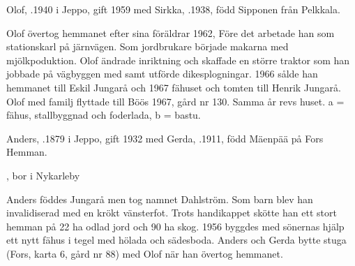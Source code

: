 %



%
Olof, .1940 i Jeppo, gift 1959 med Sirkka, .1938, född Sipponen från Pelkkala.
\begin{jhchildren}
  \item {}
  \item {}
  \item {}
\end{jhchildren}

Olof övertog hemmanet efter sina föräldrar 1962, Före det arbetade han som stationskarl på järnvägen. Som jordbrukare började makarna med mjölkpoduktion. Olof ändrade inriktning och skaffade en större traktor som  han jobbade på vägbyggen med samt utförde dikesplogningar. 1966 sålde han hemmanet till Eskil Jungarå och 1967 fähuset och tomten till Henrik Jungarå. Olof med familj flyttade till Böös 1967, gård nr 130. Samma år revs huset.  a = fähus, stallbyggnad och foderlada, b = bastu.


%
Anders, .1879 i Jeppo, gift 1932 med Gerda, .1911, född Mäenpää på Fors Hemman.
\begin{jhchildren}
  \item {}
  \item {}
  \item {}
  \item {}
  \item {}
  \item {}
  \item {}, bor i Nykarleby
\end{jhchildren}
Anders föddes Jungarå men tog namnet Dahlström. Som barn blev han invalidiserad med en krökt vänsterfot. Trots handikappet skötte han ett stort hemman på 22 ha odlad jord och 90 ha skog. 1956 byggdes med sönernas hjälp ett nytt fähus i tegel med hölada och sädesboda. Anders och Gerda bytte stuga (Fors, karta 6, gård nr 88) med Olof när han övertog hemmanet.


